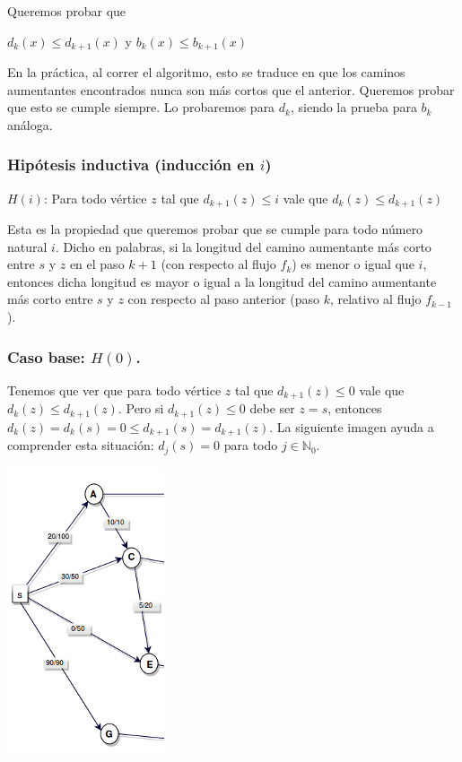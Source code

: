 \documentclass[10pt,a4paper]{article}
\begin{document}
Queremos probar que

\begin{center}
$d_k(x) \leq d_{k+1}(x)$ y $b_k(x) \leq b_{k+1}(x)$
\end{center}

En la práctica, al correr el algoritmo, esto se traduce en que los caminos aumentantes encontrados nunca son más cortos que el anterior. Queremos probar que esto se cumple siempre. Lo probaremos para $d_k$, siendo la prueba para $b_k$ análoga.

\subsubsection*{Hipótesis inductiva (inducción en $i$)}

$H(i)$: Para todo vértice $z$ tal que $d_{k+1}(z) \leq i$ vale que $d_k(z) \leq d_{k+1}(z)$

Esta es la propiedad que queremos probar que se cumple para todo número natural $i$. Dicho en palabras, si la longitud del camino aumentante más corto entre $s$ y $z$ en el paso $k+1$ (con respecto al flujo $f_k$) es menor o igual que $i$, entonces dicha longitud es mayor o igual a la longitud del camino aumentante más corto entre $s$ y $z$ con respecto al paso anterior (paso $k$, relativo al flujo $f_{k-1}$).

\subsubsection*{Caso base: $H(0)$.}

Tenemos que ver que para todo vértice $z$ tal que $d_{k+1}(z) \leq 0$ vale que $d_k(z) \leq d_{k+1}(z)$. Pero si $d_{k+1}(z) \leq 0$ debe ser $z=s$, entonces $d_k(z) = d_k(s) = 0 \leq d_{k+1}(s) = d_{k+1}(z)$. La siguiente imagen ayuda a comprender esta situación: $d_j(s) = 0 $ para todo $j \in \mathbb{N}_0$.

\begin{center}

    \begin{adjustbox}{max size={\textwidth}{\textheight}}
        \includegraphics{definitions/prueba_EK1.jpg}
        \end{adjustbox}
    
\end{center}
\end{document}
